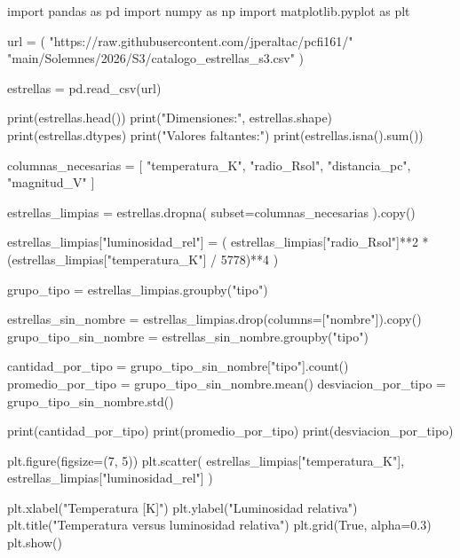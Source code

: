 \begin{solution}
\begin{pythonjupyter}
import pandas as pd
import numpy as np
import matplotlib.pyplot as plt

url = (
    "https://raw.githubusercontent.com/jperaltac/pcfi161/"
    "main/Solemnes/2026/S3/catalogo_estrellas_s3.csv"
)

estrellas = pd.read_csv(url)

print(estrellas.head())
print("Dimensiones:", estrellas.shape)
print(estrellas.dtypes)
print("Valores faltantes:")
print(estrellas.isna().sum())

columnas_necesarias = [
    "temperatura_K",
    "radio_Rsol",
    "distancia_pc",
    "magnitud_V"
]

estrellas_limpias = estrellas.dropna(
    subset=columnas_necesarias
).copy()

estrellas_limpias["luminosidad_rel"] = (
    estrellas_limpias["radio_Rsol"]**2 *
    (estrellas_limpias["temperatura_K"] / 5778)**4
)

grupo_tipo = estrellas_limpias.groupby("tipo")

estrellas_sin_nombre = estrellas_limpias.drop(columns=["nombre"]).copy()
grupo_tipo_sin_nombre = estrellas_sin_nombre.groupby("tipo")

cantidad_por_tipo = grupo_tipo_sin_nombre["tipo"].count()
promedio_por_tipo = grupo_tipo_sin_nombre.mean()
desviacion_por_tipo = grupo_tipo_sin_nombre.std()

print(cantidad_por_tipo)
print(promedio_por_tipo)
print(desviacion_por_tipo)

plt.figure(figsize=(7, 5))
plt.scatter(
    estrellas_limpias["temperatura_K"],
    estrellas_limpias["luminosidad_rel"]
)

plt.xlabel("Temperatura [K]")
plt.ylabel("Luminosidad relativa")
plt.title("Temperatura versus luminosidad relativa")
plt.grid(True, alpha=0.3)
plt.show()
\end{pythonjupyter}
\end{solution}
